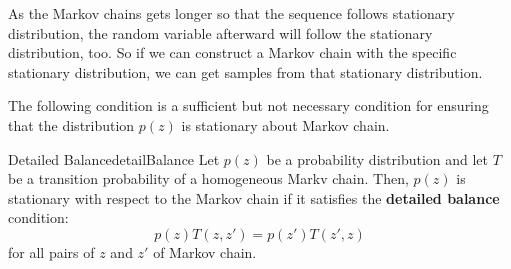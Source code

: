 \documentclass{article}
\begin{document}
        As the Markov chains gets longer so that the sequence follows stationary distribution, the random variable afterward will follow the stationary distribution, too.
        So if we can construct a Markov chain with the specific stationary distribution, we can get samples from that stationary distribution.

        The following condition is a sufficient but not necessary condition for ensuring that the distribution $p(z)$ is
        stationary about Markov chain.

        \begin{thm}{Detailed Balance}{detailBalance}
            Let $p(z)$ be a probability distribution and let $T$ be a transition probability of a homogeneous Markv chain.
            Then, $p(z)$ is stationary with respect to the Markov chain if it satisfies the \textbf{detailed balance} condition:
            \[
            p(z)T(z, z') = p(z') T(z', z)
            \]
            for all pairs of $z$ and $z'$ of Markov chain.
        \end{thm}
\end{document}
